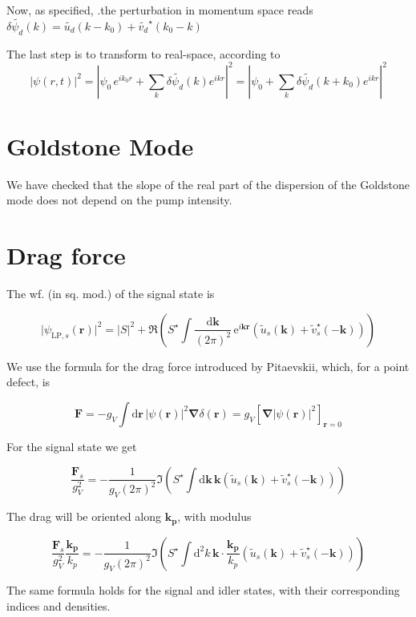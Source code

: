 \documentclass[a4paper,prb,10pt,aps,twocolumn]{revtex4-1}
\newcommand{\vect}[1]{\boldsymbol{#1}}
\begin{document}
Now, as specified, .the perturbation in momentum space reads 
$\delta\widetilde{\psi_{d}}(k)=\widetilde{u_{d}}(k-
k_{0})+\widetilde{v_{d}}^{\star}(k_{0}-k)$

The last step is to transform to real-space, according to
\[
\left|\psi(r,t)\right|^{2}=\left|\psi_{0}\, 
e^{ik_{0}r}+\sum_{k}\delta\widetilde{\psi_{d}}
(k)e^{ikr}\right|^{2}=\left|\psi_{0}+\sum_{k}\delta\widetilde{\psi_{d}}
(k+k_{0})e^{ikr}\right|^{2}
\]


\section{Goldstone Mode}
\label{sec:goldstone}

We have checked that the slope of the real part of the dispersion of the 
Goldstone mode does not depend on the pump intensity.

\section{Drag force}
\label{sec:drag}

The wf. (in sq. mod.) of the signal state is

\begin{equation}
\vert \psi_{\text{LP},s}(\vect{r})\vert^2 = \vert S \vert^2 + \Re\left( S^{\star} 
\int \frac{\mathrm{d}\vect{k}}{(2 \pi)^2}\, \mathrm{e}^{i \vect{k} \vect{r}} 
\left( \widetilde{u}_s(\vect{k}) + \widetilde{v}_s^{\star}(-\vect{k}) \right) 
\right)
\end{equation}

We use the formula for the drag force introduced by Pitaevskii, which, for a 
point defect, is

\begin{equation}
\vect{F}= - g_V \int \mathrm{d} \vect{r} \, \vert \psi(\vect{r}) \vert ^2 
\vect{\nabla} \delta(\vect{r}) = g_V \left[ \vect{\nabla} \vert \psi(\vect{r}) 
\vert ^2 \right]_{\vect{r}=0}
\end{equation}

For the signal state we get

\begin{equation}
\frac{\vect{F}_s}{g_V^2} = -\frac{1}{g_V (2 \pi)^2} \Im \left( S^{\star} \int 
\mathrm{d}\vect{k} \, \vect{k} \left( \widetilde{u}_s(\vect{k}) + 
\widetilde{v}_s^{\star}(-\vect{k}) \right) \right)
\end{equation}

The drag will be oriented along $\vect{k_p}$, with modulus

\begin{equation}
\frac{\vect{F}_s}{g_V^2} \frac{\vect{k_p}}{k_p} = -\frac{1}{g_V (2 \pi)^2} \Im 
\left( S^{\star} \int \mathrm{d}^2 k \, \vect{k} \cdot \frac{\vect{k_p}}{k_p} 
\left( \widetilde{u}_s(\vect{k}) + \widetilde{v}_s^{\star}(-\vect{k}) \right) 
\right)
\end{equation}

The same formula holds for the signal and idler states, with their
corresponding indices and densities.


\end{document}
